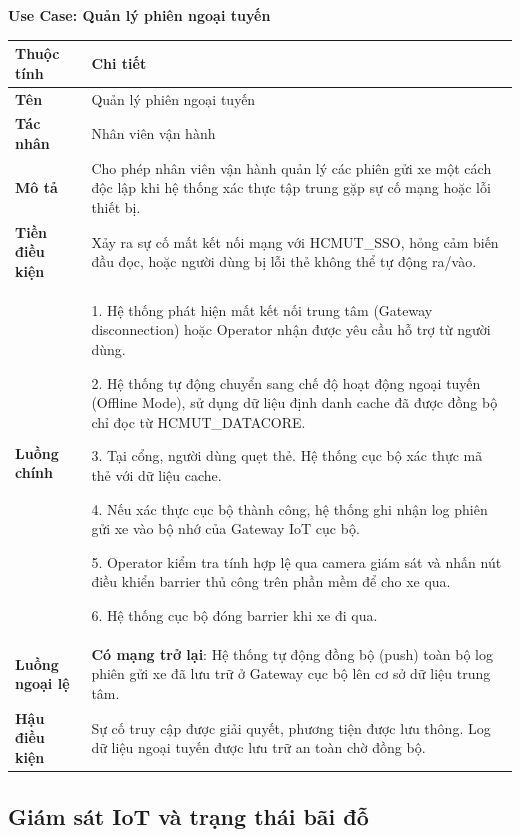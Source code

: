 \noindent \textbf{Use Case: Quản lý phiên ngoại tuyến} \\
\renewcommand{\arraystretch}{1.6}
\begin{xltabular}{\textwidth}{|l|X|}
\hline
\textbf{Thuộc tính} & \textbf{Chi tiết} \\
\hline
\textbf{Tên} & Quản lý phiên ngoại tuyến \\
\hline
\textbf{Tác nhân} & Nhân viên vận hành \\
\hline
\textbf{Mô tả} & Cho phép nhân viên vận hành quản lý các phiên gửi xe một cách độc lập khi hệ thống xác thực tập trung gặp sự cố mạng hoặc lỗi thiết bị. \\
\hline
\textbf{Tiền điều kiện} & Xảy ra sự cố mất kết nối mạng với HCMUT\_SSO, hỏng cảm biến đầu đọc, hoặc người dùng bị lỗi thẻ không thể tự động ra/vào. \\
\hline
\textbf{Luồng chính} & 
1. Hệ thống phát hiện mất kết nối trung tâm (Gateway disconnection) hoặc Operator nhận được yêu cầu hỗ trợ từ người dùng. 

2. Hệ thống tự động chuyển sang chế độ hoạt động ngoại tuyến (Offline Mode), sử dụng dữ liệu định danh cache đã được đồng bộ chỉ đọc từ HCMUT\_DATACORE. 

3. Tại cổng, người dùng quẹt thẻ. Hệ thống cục bộ xác thực mã thẻ với dữ liệu cache. 

4. Nếu xác thực cục bộ thành công, hệ thống ghi nhận log phiên gửi xe vào bộ nhớ của Gateway IoT cục bộ. 

5. Operator kiểm tra tính hợp lệ qua camera giám sát và nhấn nút điều khiển barrier thủ công trên phần mềm để cho xe qua.

6. Hệ thống cục bộ đóng barrier khi xe đi qua.\\
\hline

\textbf{Luồng ngoại lệ} & 
\textbf{Có mạng trở lại}: Hệ thống tự động đồng bộ (push) toàn bộ log phiên gửi xe đã lưu trữ ở Gateway cục bộ lên cơ sở dữ liệu trung tâm.\\
\hline

\textbf{Hậu điều kiện} & Sự cố truy cập được giải quyết, phương tiện được lưu thông. Log dữ liệu ngoại tuyến được lưu trữ an toàn chờ đồng bộ. \\
\hline
\end{xltabular}

\newpage
\subsection{Giám sát IoT và trạng thái bãi đỗ}
